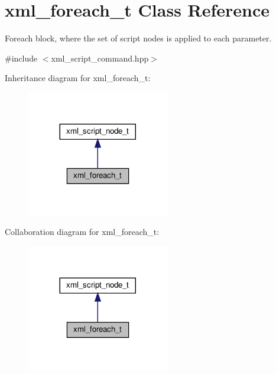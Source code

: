 \hypertarget{structxml__foreach__t}{}\section{xml\+\_\+foreach\+\_\+t Class Reference}
\label{structxml__foreach__t}


Foreach block, where the set of script nodes is applied to each parameter.  




{\ttfamily \#include $<$xml\+\_\+script\+\_\+command.\+hpp$>$}



Inheritance diagram for xml\+\_\+foreach\+\_\+t\+:
\nopagebreak
\begin{figure}[H]
\begin{center}
\leavevmode
\includegraphics[width=176pt]{d3/d1d/structxml__foreach__t__inherit__graph}
\end{center}
\end{figure}


Collaboration diagram for xml\+\_\+foreach\+\_\+t\+:
\nopagebreak
\begin{figure}[H]
\begin{center}
\leavevmode
\includegraphics[width=176pt]{d8/d51/structxml__foreach__t__coll__graph}
\end{center}
\end{figure}
